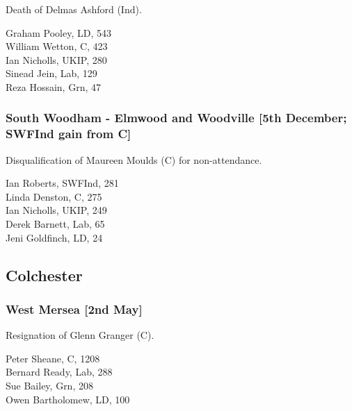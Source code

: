 \documentclass[a4paper,openany,10pt]{book}
\begin{document}

Death of Delmas Ashford (Ind).



Graham Pooley, LD, 543\\
William Wetton, C, 423\\
Ian Nicholls, UKIP, 280\\
Sinead Jein, Lab, 129\\
Reza Hossain, Grn, 47\\


\subsubsection*{South Woodham - Elmwood and Woodville  \hspace*{\fill}\nolinebreak[1]%
\enspace\hspace*{\fill}
[5th December; SWFInd gain from C]}


Disqualification of Maureen Moulds (C) for non-attendance.



Ian Roberts, SWFInd, 281\\
Linda Denston, C, 275\\
Ian Nicholls, UKIP, 249\\
Derek Barnett, Lab, 65\\
Jeni Goldfinch, LD, 24\\


\subsection*{Colchester}

\subsubsection*{West Mersea \hspace*{\fill}\nolinebreak[1]%
\enspace\hspace*{\fill}
[2nd May]}


Resignation of Glenn Granger (C).



Peter Sheane, C, 1208\\
Bernard Ready, Lab, 288\\
Sue Bailey, Grn, 208\\
Owen Bartholomew, LD, 100\\
\end{document}
